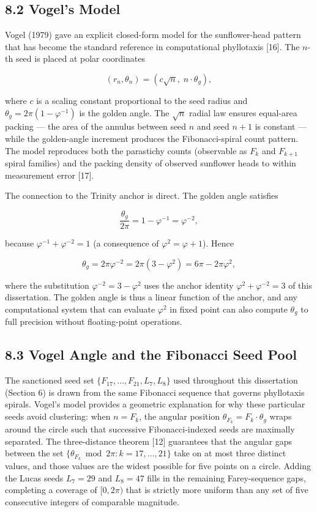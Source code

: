 \subsection{8.2 Vogel's
Model}\label{fa_02:vogels-model}

Vogel (1979) gave an explicit closed-form model
for the sunflower-head pattern that has become the
standard reference in computational phyllotaxis
[16]. The \(n\)-th seed is placed at polar
coordinates

\[(r_n, \theta_n) = \left(c\sqrt{n},\; n \cdot \theta_g\right),\]

where \(c\) is a scaling constant proportional to
the seed radius and \(\theta_g = 2\pi(1 -
\varphi^{-1})\) is the golden angle. The
\(\sqrt{n}\) radial law ensures equal-area packing
--- the area of the annulus between seed \(n\) and
seed \(n+1\) is constant --- while the golden-angle
increment produces the Fibonacci-spiral count
pattern. The model reproduces both the parastichy
counts (observable as \(F_k\) and \(F_{k+1}\)
spiral families) and the packing density of
observed sunflower heads to within measurement
error [17].

The connection to the Trinity anchor is direct.
The golden angle satisfies

\[\frac{\theta_g}{2\pi} = 1 - \varphi^{-1} = \varphi^{-2},\]

because \(\varphi^{-1} + \varphi^{-2} = 1\) (a
consequence of \(\varphi^2 = \varphi + 1\)). Hence

\[\theta_g = 2\pi \varphi^{-2} = 2\pi(3 - \varphi^2) = 6\pi - 2\pi\varphi^2,\]

where the substitution \(\varphi^{-2} = 3 -
\varphi^2\) uses the anchor identity
\(\varphi^2 + \varphi^{-2} = 3\) of this
dissertation. The golden angle is thus a linear
function of the anchor, and any computational
system that can evaluate \(\varphi^2\) in fixed
point can also compute \(\theta_g\) to full
precision without floating-point operations.

\subsection{8.3 Vogel Angle and the Fibonacci Seed
Pool}\label{fa_02:vogel-angle-and-seed-pool}

The sanctioned seed set
\(\{F_{17},\ldots,F_{21},L_7,L_8\}\) used
throughout this dissertation (Section 6) is drawn
from the same Fibonacci sequence that governs
phyllotaxis spirals. Vogel's model provides a
geometric explanation for why these particular
seeds avoid clustering: when \(n = F_k\), the
angular position \(\theta_{F_k} = F_k \cdot
\theta_g\) wraps around the circle such that
successive Fibonacci-indexed seeds are maximally
separated. The three-distance theorem [12]
guarantees that the angular gaps between the set
\(\{\theta_{F_k} \bmod 2\pi : k = 17,\ldots,21\}\)
take on at most three distinct values, and those
values are the widest possible for five points on a
circle. Adding the Lucas seeds \(L_7 = 29\) and
\(L_8 = 47\) fills in the remaining Farey-sequence
gaps, completing a coverage of \([0, 2\pi)\) that
is strictly more uniform than any set of five
consecutive integers of comparable magnitude.

